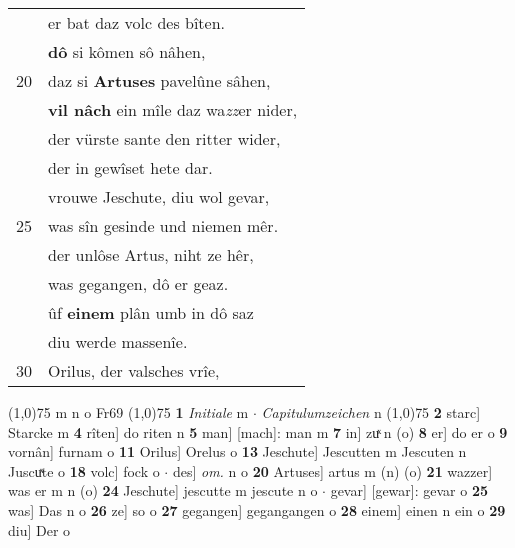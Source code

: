 \documentclass[8pt,a4paper,notitlepage]{article}
\begin{document}
\begin{table}[ht]
\begin{minipage}[t]{0.5\linewidth}
\begin{tabular}{rl}
 & er bat daz volc des bîten.\\ 
 & \textbf{dô} si kômen sô nâhen,\\ 
20 & daz si \textbf{Artuses} pavelûne sâhen,\\ 
 & \textbf{vil nâch} ein mîle daz wa\textit{zz}er nider,\\ 
 & der vürste sante den ritter wider,\\ 
 & der in gewîset hete dar.\\ 
 & vrouwe Jeschute, diu wol gevar,\\ 
25 & was sîn gesinde und niemen mêr.\\ 
 & der unlôse Artus, niht ze hêr,\\ 
 & was gegangen, dô er geaz.\\ 
 & ûf \textbf{einem} plân umb in dô saz\\ 
 & diu werde massenîe.\\ 
30 & Orilus, der valsches vrîe,\\ 
\end{tabular}
\scriptsize
\line(1,0){75} \newline
m n o Fr69 \newline
\line(1,0){75} \newline
\textbf{1} \textit{Initiale} m   $\cdot$ \textit{Capitulumzeichen} n  \newline
\line(1,0){75} \newline
\textbf{2} starc] Starcke m \textbf{4} rîten] do riten n \textbf{5} man] [mach]: man m \textbf{7} in] zuͯ n (o) \textbf{8} er] do er o \textbf{9} vornân] furnam o \textbf{11} Orilus] Orelus o \textbf{13} Jeschute] Jescutten m Jescuten n Juscuͯte o \textbf{18} volc] fock o  $\cdot$ des] \textit{om.} n o \textbf{20} Artuses] artus m (n) (o) \textbf{21} wazzer] was er m n (o) \textbf{24} Jeschute] jescutte m jescute n o  $\cdot$ gevar] [gewar]: gevar o \textbf{25} was] Das n o \textbf{26} ze] so o \textbf{27} gegangen] gegangangen o \textbf{28} einem] einen n ein o \textbf{29} diu] Der o \newline
\end{minipage}
\end{table}
\newpage
\end{document}
